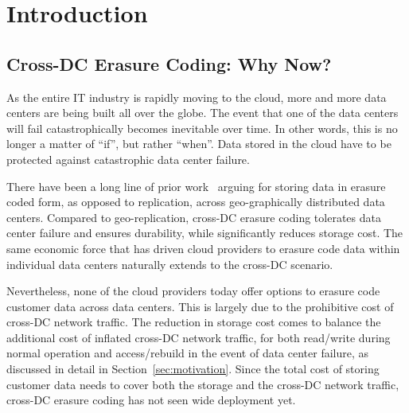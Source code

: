 \section{Introduction}

\subsection{Cross-DC Erasure Coding: Why Now?}

As the entire IT industry is rapidly moving to the cloud, more and more data
centers are being built all over the globe. The event that one of the data
centers will fail catastrophically becomes inevitable over time. In other words,
this is no longer a matter of ``if'', but rather ``when''. 
Data stored in the
cloud have to be protected against catastrophic data center failure.

There have been a long line of prior work~\cite{oceanstore:asplos00,
  pond:fast13, hail:ccs09, racs:socc10, hu12nccloud} arguing for storing data
in erasure coded form, as opposed to replication, across geo-graphically
distributed data centers. Compared to geo-replication, cross-DC erasure coding
tolerates data center failure and ensures durability, while significantly
reduces storage cost. The same economic force that has driven cloud providers to
erasure code data within individual data centers naturally extends to the
cross-DC scenario.

Nevertheless, none of the cloud providers today offer options to erasure code
customer data across data centers. This is largely due to the prohibitive cost
of cross-DC network traffic. The reduction in storage cost comes to balance the
additional cost of inflated cross-DC network traffic, for both read/write during
normal operation and access/rebuild in the event of data center failure, as
discussed in detail in Section~\ref{sec:motivation}. Since the total cost of
storing customer data needs to cover both the storage and the cross-DC network
traffic, cross-DC erasure coding has not seen wide deployment yet.



